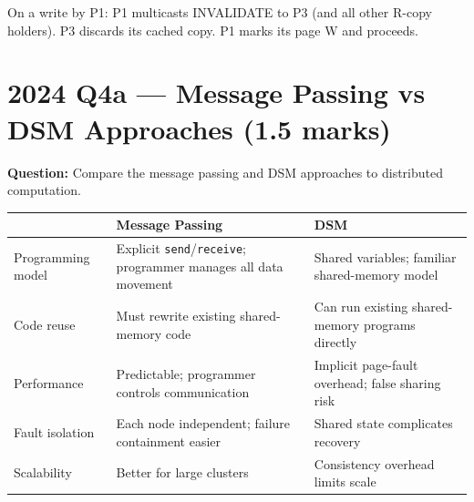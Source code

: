 \documentclass[12pt,a4paper]{article}
\begin{document}
\begin{center}
\end{center}

On a write by P1: P1 multicasts INVALIDATE to P3 (and all other R-copy holders). P3 discards its cached copy. P1 marks its page W and proceeds.

\section{2024 Q4a --- Message Passing vs DSM Approaches (1.5 marks)}

\textbf{Question:} Compare the message passing and DSM approaches to distributed computation.

\begin{center}
\begin{tabular}{@{}p{4cm}p{5cm}p{5cm}@{}}
\toprule
 & \textbf{Message Passing} & \textbf{DSM} \\
\midrule
Programming model & Explicit \texttt{send}/\texttt{receive}; programmer manages all data movement & Shared variables; familiar shared-memory model \\
Code reuse & Must rewrite existing shared-memory code & Can run existing shared-memory programs directly \\
Performance & Predictable; programmer controls communication & Implicit page-fault overhead; false sharing risk \\
Fault isolation & Each node independent; failure containment easier & Shared state complicates recovery \\
Scalability & Better for large clusters & Consistency overhead limits scale \\
\bottomrule
\end{tabular}
\end{center}
\end{document}
